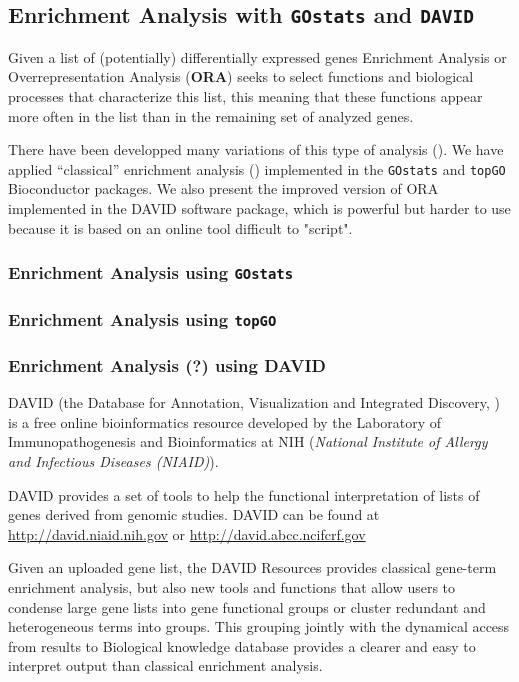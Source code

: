 \documentclass{article}\usepackage[]{graphicx}\usepackage[]{color}
\begin{document}
\subsection{Enrichment Analysis with \texttt{GOstats} and \texttt{DAVID}}

Given a list of (potentially) differentially expressed genes Enrichment Analysis or Overrepresentation Analysis (\textbf{ORA}) seeks to select functions and biological processes that characterize this list, this meaning that these functions appear more often in the list than in the remaining set of analyzed genes.

There have been developped many variations of this type of analysis (\cite {Khatri:2005}). 
We have applied ``classical'' enrichment analysis (\cite{Gentleman:2004}) implemented in the \texttt {GOstats} and \texttt{topGO} Bioconductor packages. We also present the improved version of ORA implemented in the DAVID software package, which is powerful but harder to use because it is based on an online tool difficult to "script".

\subsubsection{Enrichment Analysis using \texttt{GOstats}}

\subsubsection{Enrichment Analysis using \texttt{topGO}}

\subsubsection{Enrichment Analysis (?) using DAVID}

DAVID (the Database for Annotation, Visualization and Integrated Discovery, \cite{DAVID:2009}) is a free online bioinformatics resource developed by the Laboratory of Immunopathogenesis and Bioinformatics at NIH (\emph{National Institute of Allergy and Infectious Diseases (NIAID)}). 

DAVID provides a set of tools to help the functional interpretation of lists of genes derived from genomic studies. DAVID can be found at \url{http://david.niaid.nih.gov} or \url{http://david.abcc.ncifcrf.gov}

Given an uploaded gene list, the DAVID Resources provides classical gene-term enrichment analysis, but also new tools and functions that allow users to condense large gene lists into gene functional groups or cluster redundant and heterogeneous terms into groups. This grouping jointly with the dynamical access from results to Biological knowledge database provides a clearer and easy to interpret output than classical enrichment analysis.
\end{document}
